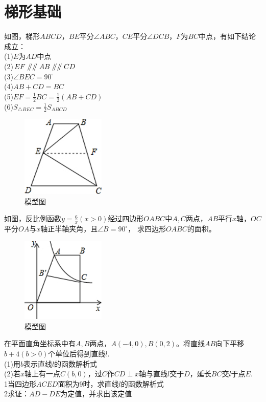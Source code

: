 \documentclass{ecnuthesis}
\newcommand\px{\mathrel{/\mkern-5mu/}}  %
\begin{document}
\section{梯形基础}
\begin{model}
    如图，梯形$ABCD$，$BE$平分$\angle ABC$，$CE$平分$\angle DCB$，$F$为$BC$中点，有如下结论成立：\\
    (1)$E$为$AD$中点 \\
    (2)$EF\px \px AB \px \px CD$ \\
    (3)$\angle BEC=90^\circ$ \\
    (4)$AB+CD=BC$ \\
    (5)$EF=\frac{1}{2}BC=\frac{1}{2}(AB+CD)$ \\
    (6)$S_{\triangle BEC}=\frac{1}{2}S_{ABCD}$
\end{model}
\begin{figure}[H]
\centering
\includegraphics[width=4cm]{picture/619.png}
\caption{模型图}
\end{figure}
\begin{problem}
    如图，反比例函数$y=\frac{6}{x}(x>0)$经过四边形$OABC$中$A,C$两点，$AB$平行$x$轴，$OC$平分$OA$与$x$轴正半轴夹角，且$\angle B=90^\circ$，
    求四边形$OABC$的面积。
\end{problem}
\begin{figure}[H]
\centering
\includegraphics[width=4cm]{picture/620.png}
\caption{模型图}
\end{figure}
\begin{problem}
    在平面直角坐标系中有$A,B$两点，$A(-4,0),B(0,2)$。将直线$AB$向下平移$b+4(b>0)$个单位后得到直线$l$. \\
    (1)用$b$表示直线$l$的函数解析式 \\
    (2)若$x$轴上有一点$C(b,0)$，过$C$作$CD\perp x$轴与直线$l$交于$D$，延长$BC$交$l$于点$E$. \\
    \textcircled{\small{1}}当四边形$ACED$面积为9时，求直线$l$的函数解析式 \\
    \textcircled{\small{2}}求证：$AD-DE$为定值，并求出该定值
\end{problem}
\end{document}
